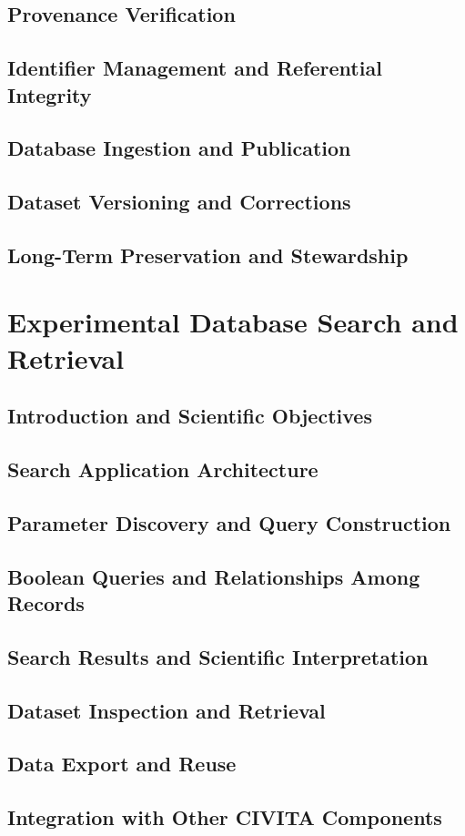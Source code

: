 \section{Provenance Verification}

\section{Identifier Management and Referential Integrity}

\section{Database Ingestion and Publication}

\section{Dataset Versioning and Corrections}

\section{Long-Term Preservation and Stewardship}


\chapter{Experimental Database Search and Retrieval}
\label{chap:experimental-search}

\section{Introduction and Scientific Objectives}

\section{Search Application Architecture}

\section{Parameter Discovery and Query Construction}

\section{Boolean Queries and Relationships Among Records}

\section{Search Results and Scientific Interpretation}

\section{Dataset Inspection and Retrieval}

\section{Data Export and Reuse}

\section{Integration with Other CIVITA Components}
